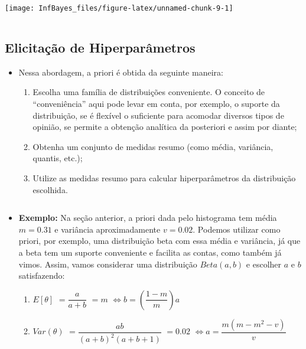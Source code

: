 \documentclass[
]{book}
\providecommand{\tightlist}{%
  \setlength{\itemsep}{0pt}\setlength{\parskip}{0pt}}
\begin{document}
\begin{center}\texttt{[image: InfBayes\_files/figure-latex/unnamed-chunk-9-1]} \end{center}

\(~\)

\hypertarget{elicitauxe7uxe3o-de-hiperparuxe2metros}{%
\subsection{Elicitação de Hiperparâmetros}\label{elicitauxe7uxe3o-de-hiperparuxe2metros}}

\begin{itemize}
\tightlist
\item
  Nessa abordagem, a priori é obtida da seguinte maneira:

  \begin{enumerate}
  \def\labelenumi{\arabic{enumi}.}
  \tightlist
  \item
    Escolha uma família de distribuições conveniente. O conceito de ``conveniência'' aqui pode levar em conta, por exemplo, o suporte da distribuição, se é flexível o suficiente para acomodar diversos tipos de opinião, se permite a obtenção analítica da posteriori e assim por diante;\\
  \item
    Obtenha um conjunto de medidas resumo (como média, variância, quantis, etc.);\\
  \item
    Utilize as medidas resumo para calcular hiperparâmetros da distribuição escolhida.
  \end{enumerate}
\end{itemize}

\(~\)

\begin{itemize}
\item
  \textbf{Exemplo:} Na seção anterior, a priori dada pelo histograma tem média \(m=0.31\) e variância aproximadamente \(v=0.02\). Podemos utilizar como priori, por exemplo, uma distribuição beta com essa média e variância, já que a beta tem um suporte conveniente e facilita as contas, como também já vimos. Assim, vamos considerar uma distribuição \(Beta(a,b)\) e escolher \(a\) e \(b\) satisfazendo:

  \begin{enumerate}
  \def\labelenumi{(\roman{enumi})}
  \tightlist
  \item
    \(E[\theta]\) \(=\dfrac{a}{a+b}\) \(=m\) \(\Longleftrightarrow b=\left(\dfrac{1-m}{m}\right)a\)
  \item
    \(Var(\theta)\) \(=\dfrac{ab}{(a+b)^2(a+b+1)}\) \(=0.02\) \(\Longleftrightarrow a=\dfrac{m(m-m^2-v)}{v}\)
  \end{enumerate}
\end{itemize}
\end{document}
